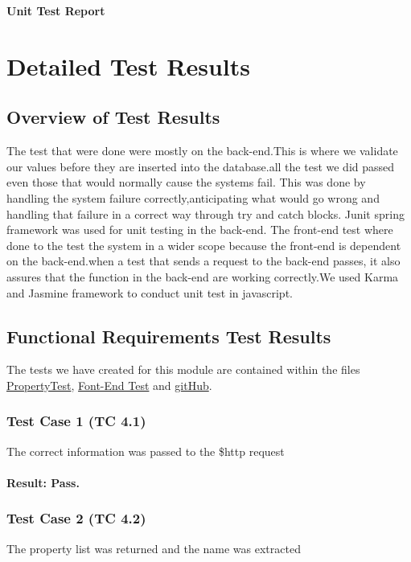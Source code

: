 \documentclass[a4paper,12pt]{article}
\begin{document}
\newpage
\begin{center}
{\huge \bfseries Unit Test Report}\\[0.5cm]
\end{center}
\section{Detailed Test Results}
\subsection{Overview of Test Results}
The test that were done were mostly on the back-end.This is where we validate our values before they are inserted into the database.all the test we did passed even those that would normally cause the systems fail. This was done by handling the system failure correctly,anticipating what would go wrong and handling that failure in a correct way through try and catch blocks. Junit spring framework was used for unit testing in the back-end. The front-end test where done to the test the system in a wider scope because the front-end is dependent on the back-end.when a test that sends a request to the back-end passes, it also assures that the function in the back-end are working correctly.We used Karma and Jasmine framework to conduct unit test in javascript.

\subsection{Functional Requirements Test Results}
The tests we have created for this module are contained within the files   \href{https://github.com/u13278012/IMPAKD/blob/master/Implementation/PIO/BackEnd/test/Test/PropertyTest.java}{PropertyTest}, \href{https://github.com/u13278012/IMPAKD/blob/master/Implementation/PIO/FrontEnd/app/addProperty/addProperty_test.js}{Font-End Test} and \href{https://github.com/u13278012/IMPAKD/}{gitHub}.

\subsubsection{Test Case 1 (TC 4.1)}
The correct information was passed to the \$http request
\paragraph{Result: Pass.}

\subsubsection{Test Case 2 (TC 4.2)}
The property list was returned and the name was extracted
\end{document}
